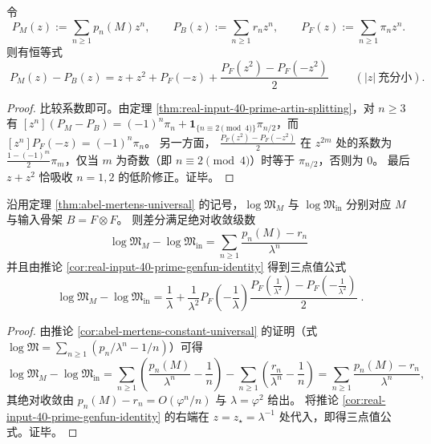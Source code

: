 \begin{corollary}\label{cor:real-input-40-prime-genfun-identity}
令
\[
P_M(z):=\sum_{n\ge 1}p_n(M)z^n,\qquad
P_B(z):=\sum_{n\ge 1}r_n z^n,\qquad
P_F(z):=\sum_{n\ge 1}\pi_n z^n.
\]
则有恒等式
\[
\boxed{\;
P_M(z)-P_B(z)= z+z^2+P_F(-z)+\frac{P_F(z^2)-P_F(-z^2)}{2}\;}
\qquad(|z|\ \text{充分小}).
\]
\end{corollary}
\begin{proof}
比较系数即可。由定理 \ref{thm:real-input-40-prime-artin-splitting}，对 \(n\ge 3\) 有
\(
[z^n](P_M-P_B)=(-1)^n\pi_n+\mathbf{1}_{\{n\equiv 2\pmod 4\}}\pi_{n/2}
\)，而
\(
[z^n]P_F(-z)=(-1)^n\pi_n
\)。
另一方面，
\(
\frac{P_F(z^2)-P_F(-z^2)}{2}
\)
在 \(z^{2m}\) 处的系数为 \(\frac{1-(-1)^m}{2}\pi_m\)，仅当 \(m\) 为奇数（即 \(n\equiv 2\pmod 4\)）时等于 \(\pi_{n/2}\)，否则为 \(0\)。
最后 \(z+z^2\) 恰吸收 \(n=1,2\) 的低阶修正。证毕。
\end{proof}

\begin{corollary}\label{cor:real-input-40-logM-fast-prime}
沿用定理 \ref{thm:abel-mertens-universal} 的记号，\(\log\mathfrak{M}_M\) 与 \(\log\mathfrak{M}_{\mathrm{in}}\) 分别对应 \(M\) 与输入骨架 \(B=F\otimes F\)。
则差分满足绝对收敛级数
\[
\boxed{\;
\log\mathfrak{M}_M-\log\mathfrak{M}_{\mathrm{in}}
=\sum_{n\ge 1}\frac{p_n(M)-r_n}{\lambda^n}\;}
\]
并且由推论 \ref{cor:real-input-40-prime-genfun-identity} 得到三点值公式
\[
\boxed{\;
\log\mathfrak{M}_M-\log\mathfrak{M}_{\mathrm{in}}
=\frac{1}{\lambda}+\frac{1}{\lambda^2}
P_F\!\left(-\frac{1}{\lambda}\right)
\frac{
P_F\!\left(\frac{1}{\lambda^2}\right)-P_F\!\left(-\frac{1}{\lambda^2}\right)
}{2}\; }.
\]
\end{corollary}
\begin{proof}
由推论 \ref{cor:abel-mertens-constant-universal} 的证明（式 \(\log\mathfrak{M}=\sum_{n\ge 1}(p_n/\lambda^n-1/n)\)）可得
\[
\log\mathfrak{M}_M-\log\mathfrak{M}_{\mathrm{in}}
=\sum_{n\ge 1}\left(\frac{p_n(M)}{\lambda^n}-\frac{1}{n}\right)
-\sum_{n\ge 1}\left(\frac{r_n}{\lambda^n}-\frac{1}{n}\right)
=\sum_{n\ge 1}\frac{p_n(M)-r_n}{\lambda^n},
\]
其绝对收敛由 \(p_n(M)-r_n=O(\varphi^n/n)\) 与 \(\lambda=\varphi^2\) 给出。
将推论 \ref{cor:real-input-40-prime-genfun-identity} 的右端在 \(z=z_\star=\lambda^{-1}\) 处代入，即得三点值公式。证毕。
\end{proof}

